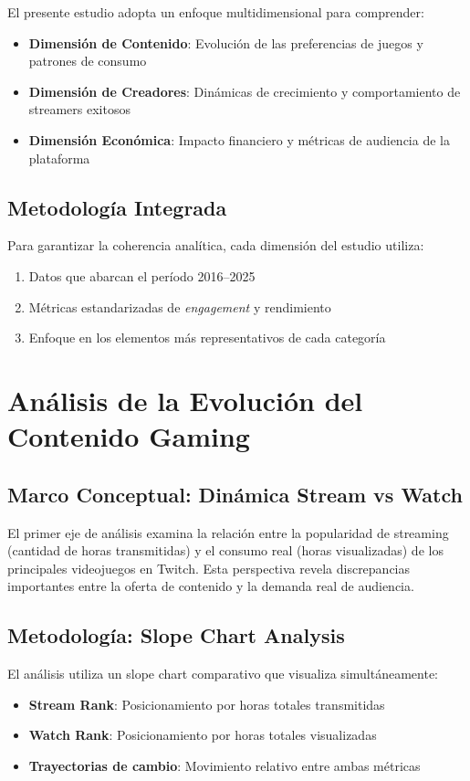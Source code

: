 \documentclass[12pt,a4paper]{article}
\begin{document}
El presente estudio adopta un enfoque multidimensional para comprender: 

\begin{itemize}
    \item \textbf{Dimensión de Contenido}: Evolución de las preferencias de juegos y patrones de consumo 
    \item \textbf{Dimensión de Creadores}: Dinámicas de crecimiento y comportamiento de streamers exitosos 
    \item \textbf{Dimensión Económica}: Impacto financiero y métricas de audiencia de la plataforma 
\end{itemize}

\subsection{Metodología Integrada} 

Para garantizar la coherencia analítica, cada dimensión del estudio utiliza: 
\begin{enumerate}
    \item Datos que abarcan el período 2016--2025 
    \item Métricas estandarizadas de \textit{engagement} y rendimiento 
    \item Enfoque en los elementos más representativos de cada categoría
\end{enumerate}
\newpage
\section{Análisis de la Evolución del Contenido Gaming} 

\subsection{Marco Conceptual: Dinámica Stream vs Watch} 

El primer eje de análisis examina la relación entre la popularidad de streaming (cantidad de horas transmitidas) y el consumo real (horas visualizadas) de los principales videojuegos en Twitch. Esta perspectiva revela discrepancias importantes entre la oferta de contenido y la demanda real de audiencia.

\subsection{Metodología: Slope Chart Analysis}

El análisis utiliza un slope chart comparativo que visualiza simultáneamente: 
\begin{itemize}
    \item \textbf{Stream Rank}: Posicionamiento por horas totales transmitidas 
    \item \textbf{Watch Rank}: Posicionamiento por horas totales visualizadas 
    \item \textbf{Trayectorias de cambio}: Movimiento relativo entre ambas métricas 
\end{itemize}
\end{document}
